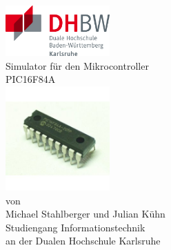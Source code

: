 \documentclass[ a4paper,	%
		11pt,		%
		pdftex,		%
		] {report}	%
\newcommand{\Was}{ PIC16F84A}
\newcommand{\Titel}{Simulator f\"ur den Mikrocontroller }
\begin{document}

\begin{singlespace}							%
\begin{titlepage}
\begin{center}								%
\vspace*{-2cm}								%
\hfill\includegraphics[width=4cm]{Bilder/dhbw-logo}\\[2cm] %

{\Huge \Titel}\\[0.5cm]							%
{\Huge \Was}\\[1cm]						%

\includegraphics[width=4cm]{Bilder/Microcontroller.jpg}\\[2cm]

{\large von\\[0.5cm]
{\large Michael Stahlberger und Julian K\"uhn}\\[0.5cm]

{\large Studiengang Informationstechnik \\
an der Dualen Hochschule Karlsruhe}\\[0.5cm]}

\vfill									%
\end{center}								%

\end{titlepage}
\end{singlespace}								%
\end{document}
